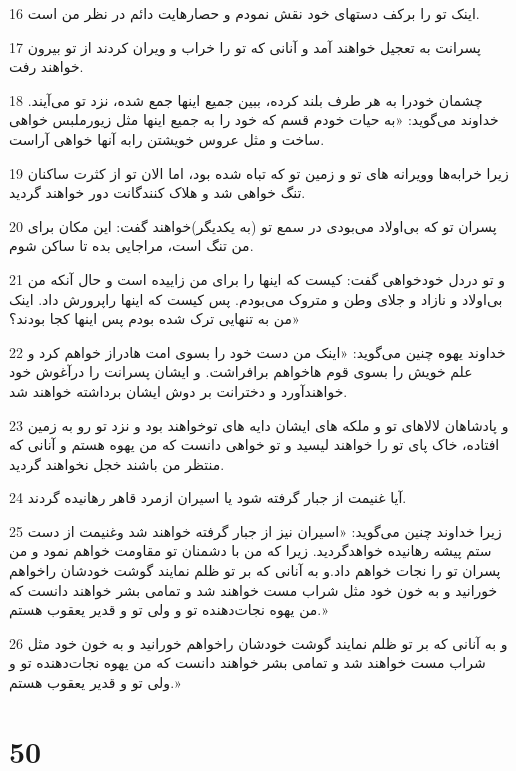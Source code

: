 \par 16 اینک تو را برکف دستهای خود نقش نمودم و حصارهایت دائم در نظر من است.
\par 17 پسرانت به تعجیل خواهند آمد و آنانی که تو را خراب و ویران کردند از تو بیرون خواهند رفت.
\par 18 چشمان خودرا به هر طرف بلند کرده، ببین جمیع اینها جمع شده، نزد تو می‌آیند. خداوند می‌گوید: «به حیات خودم قسم که خود را به جمیع اینها مثل زیورملبس خواهی ساخت و مثل عروس خویشتن رابه آنها خواهی آراست.
\par 19 زیرا خرابه‌ها وویرانه های تو و زمین تو که تباه شده بود، اما الان تو از کثرت ساکنان تنگ خواهی شد و هلاک کنندگانت دور خواهند گردید.
\par 20 پسران تو که بی‌اولاد می‌بودی در سمع تو (به یکدیگر)خواهند گفت: این مکان برای من تنگ است، مراجایی بده تا ساکن شوم.
\par 21 و تو دردل خودخواهی گفت: کیست که اینها را برای من زاییده است و حال آنکه من بی‌اولاد و نازاد و جلای وطن و متروک می‌بودم. پس کیست که اینها راپرورش داد. اینک من به تنهایی ترک شده بودم پس اینها کجا بودند؟» 
\par 22 خداوند یهوه چنین می‌گوید: «اینک من دست خود را بسوی امت هادراز خواهم کرد و علم خویش را بسوی قوم هاخواهم برافراشت. و ایشان پسرانت را درآغوش خود خواهند‌آورد و دخترانت بر دوش ایشان برداشته خواهند شد.
\par 23 و پادشاهان لالاهای تو و ملکه های ایشان دایه های توخواهند بود و نزد تو رو به زمین افتاده، خاک پای تو را خواهند لیسید و تو خواهی دانست که من یهوه هستم و آنانی که منتظر من باشند خجل نخواهند گردید.
\par 24 آیا غنیمت از جبار گرفته شود یا اسیران ازمرد قاهر رهانیده گردند.
\par 25 زیرا خداوند چنین می‌گوید: «اسیران نیز از جبار گرفته خواهند شد وغنیمت از دست ستم پیشه رهانیده خواهدگردید. زیرا که من با دشمنان تو مقاومت خواهم نمود و من پسران تو را نجات خواهم داد.و به آنانی که بر تو ظلم نمایند گوشت خودشان راخواهم خورانید و به خون خود مثل شراب مست خواهند شد و تمامی بشر خواهند دانست که من یهوه نجات‌دهنده تو و ولی تو و قدیر یعقوب هستم.»
\par 26 و به آنانی که بر تو ظلم نمایند گوشت خودشان راخواهم خورانید و به خون خود مثل شراب مست خواهند شد و تمامی بشر خواهند دانست که من یهوه نجات‌دهنده تو و ولی تو و قدیر یعقوب هستم.»
 
\chapter{50}

